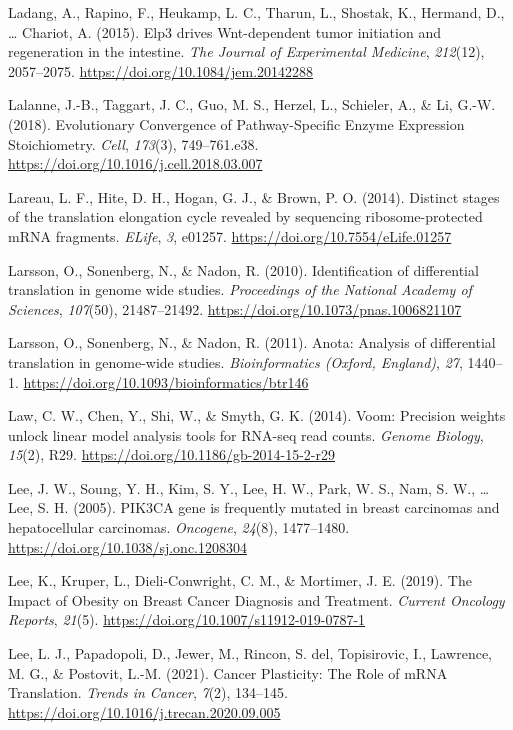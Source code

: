 \documentclass[12pt,openany]{book}
\begin{document}
\hypertarget{ref-Ladang2015}{}
Ladang, A., Rapino, F., Heukamp, L. C., Tharun, L., Shostak, K.,
Hermand, D., \ldots{} Chariot, A. (2015). Elp3 drives Wnt-dependent
tumor initiation and regeneration in the intestine. \emph{The Journal of
Experimental Medicine}, \emph{212}(12), 2057--2075.
\url{https://doi.org/10.1084/jem.20142288}

\hypertarget{ref-Lalanne2018}{}
Lalanne, J.-B., Taggart, J. C., Guo, M. S., Herzel, L., Schieler, A., \&
Li, G.-W. (2018). Evolutionary Convergence of Pathway-Specific Enzyme
Expression Stoichiometry. \emph{Cell}, \emph{173}(3), 749--761.e38.
\url{https://doi.org/10.1016/j.cell.2018.03.007}

\hypertarget{ref-Lareau2014}{}
Lareau, L. F., Hite, D. H., Hogan, G. J., \& Brown, P. O. (2014).
Distinct stages of the translation elongation cycle revealed by
sequencing ribosome-protected mRNA fragments. \emph{ELife}, \emph{3},
e01257. \url{https://doi.org/10.7554/eLife.01257}

\hypertarget{ref-Larsson2010}{}
Larsson, O., Sonenberg, N., \& Nadon, R. (2010). Identification of
differential translation in genome wide studies. \emph{Proceedings of
the National Academy of Sciences}, \emph{107}(50), 21487--21492.
\url{https://doi.org/10.1073/pnas.1006821107}

\hypertarget{ref-Larsson2011}{}
Larsson, O., Sonenberg, N., \& Nadon, R. (2011). Anota: Analysis of
differential translation in genome-wide studies. \emph{Bioinformatics
(Oxford, England)}, \emph{27}, 1440--1.
\url{https://doi.org/10.1093/bioinformatics/btr146}

\hypertarget{ref-Law2014}{}
Law, C. W., Chen, Y., Shi, W., \& Smyth, G. K. (2014). Voom: Precision
weights unlock linear model analysis tools for RNA-seq read counts.
\emph{Genome Biology}, \emph{15}(2), R29.
\url{https://doi.org/10.1186/gb-2014-15-2-r29}

\hypertarget{ref-Lee2005}{}
Lee, J. W., Soung, Y. H., Kim, S. Y., Lee, H. W., Park, W. S., Nam, S.
W., \ldots{} Lee, S. H. (2005). PIK3CA gene is frequently mutated in
breast carcinomas and hepatocellular carcinomas. \emph{Oncogene},
\emph{24}(8), 1477--1480. \url{https://doi.org/10.1038/sj.onc.1208304}

\hypertarget{ref-Lee2019}{}
Lee, K., Kruper, L., Dieli-Conwright, C. M., \& Mortimer, J. E. (2019).
The Impact of Obesity on Breast Cancer Diagnosis and Treatment.
\emph{Current Oncology Reports}, \emph{21}(5).
\url{https://doi.org/10.1007/s11912-019-0787-1}

\hypertarget{ref-Lee2021}{}
Lee, L. J., Papadopoli, D., Jewer, M., Rincon, S. del, Topisirovic, I.,
Lawrence, M. G., \& Postovit, L.-M. (2021). Cancer Plasticity: The Role
of mRNA Translation. \emph{Trends in Cancer}, \emph{7}(2), 134--145.
\url{https://doi.org/10.1016/j.trecan.2020.09.005}
\end{document}
